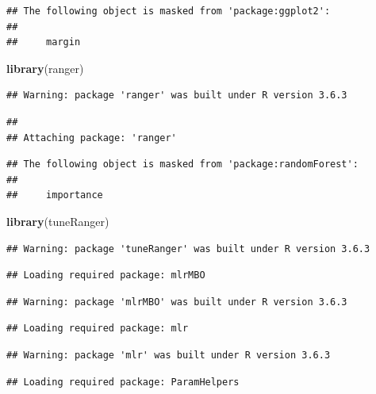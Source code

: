 \documentclass[
]{article}
\newenvironment{Shaded}{\begin{snugshade}}{\end{snugshade}}
\newcommand{\KeywordTok}[1]{\textcolor[rgb]{0.13,0.29,0.53}{\textbf{#1}}}
\newcommand{\NormalTok}[1]{#1}
\begin{document}
\begin{verbatim}
## The following object is masked from 'package:ggplot2':
## 
##     margin
\end{verbatim}

\begin{Shaded}
\begin{Highlighting}[]
\KeywordTok{library}\NormalTok{(ranger)}
\end{Highlighting}
\end{Shaded}

\begin{verbatim}
## Warning: package 'ranger' was built under R version 3.6.3
\end{verbatim}

\begin{verbatim}
## 
## Attaching package: 'ranger'
\end{verbatim}

\begin{verbatim}
## The following object is masked from 'package:randomForest':
## 
##     importance
\end{verbatim}

\begin{Shaded}
\begin{Highlighting}[]
\KeywordTok{library}\NormalTok{(tuneRanger)}
\end{Highlighting}
\end{Shaded}

\begin{verbatim}
## Warning: package 'tuneRanger' was built under R version 3.6.3
\end{verbatim}

\begin{verbatim}
## Loading required package: mlrMBO
\end{verbatim}

\begin{verbatim}
## Warning: package 'mlrMBO' was built under R version 3.6.3
\end{verbatim}

\begin{verbatim}
## Loading required package: mlr
\end{verbatim}

\begin{verbatim}
## Warning: package 'mlr' was built under R version 3.6.3
\end{verbatim}

\begin{verbatim}
## Loading required package: ParamHelpers
\end{verbatim}
\end{document}
